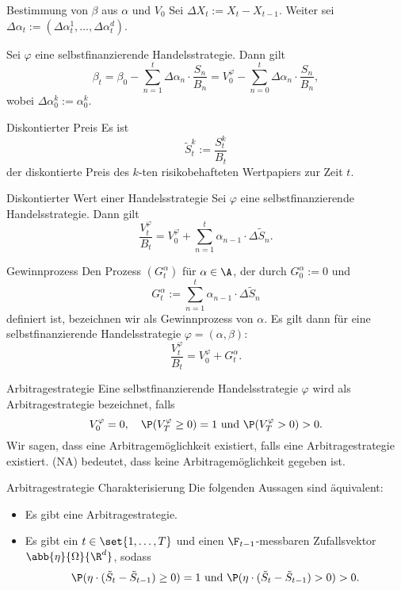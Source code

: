 \begin{karte}{Bestimmung von \(\beta\) aus \(\alpha\) und \(V_0\)}
Sei \(\Delta X_t := X_t - X_{t-1}\). Weiter sei \(\Delta \alpha_t := (\Delta \alpha_t^1, \ldots, \Delta \alpha_t^d)\). 

Sei \(\varphi\) eine selbstfinanzierende Handelsstrategie. Dann gilt 
\[ \beta_t = \beta_0 - \sum_{n=1}^t \Delta \alpha_n \cdot \frac{S_n}{B_n} = V_0^\varphi - \sum_{n=0}^t \Delta \alpha_n \cdot \frac{S_n}{B_n}, \]
wobei \(\Delta \alpha_0^k := \alpha_0^k\).
\end{karte}

\begin{karte}{Diskontierter Preis}
Es ist 
\[ \tilde{S}_t^k := \frac{S_t^k}{B_t} \]
der diskontierte Preis des \(k\)-ten risikobehafteten Wertpapiers zur Zeit \(t\).
\end{karte}

\begin{karte}{Diskontierter Wert einer Handelsstrategie}
Sei \(\varphi\) eine selbstfinanzierende Handelsstrategie. Dann gilt 
\[ \frac{V_t^\varphi}{B_t} = V_0^\varphi + \sum_{n=1}^t \alpha_{n-1} \cdot \Delta \tilde{S}_n. \]
\end{karte}

\begin{karte}{Gewinnprozess}
Den Prozess \((G_t^\alpha)\) für \(\alpha \in \A\), der durch \(G_0^\alpha := 0\) und 
\[ G_t^\alpha := \sum_{n=1}^t \alpha_{n-1} \cdot \Delta \tilde{S}_n \]
definiert ist, bezeichnen wir als Gewinnprozess von \(\alpha\). Es gilt dann für eine selbstfinanzierende 
Handelsstrategie \(\varphi = (\alpha, \beta)\): 
\[ \frac{V_t^\varphi}{B_t} = V_0^\varphi + G_t^\alpha. \]
\end{karte}

\begin{karte}{Arbitragestrategie}
Eine selbstfinanzierende Handelsstrategie \(\varphi\) wird als Arbitragestrategie bezeichnet, falls 
\[ V_0^\varphi = 0,\quad \P(V_T^\varphi \geq 0) = 1 \text{ und } \P(V_T^\varphi > 0) > 0. \]
Wir sagen, dass eine Arbitragemöglichkeit existiert, falls eine Arbitragestrategie existiert. 
(NA) bedeutet, dass keine Arbitragemöglichkeit gegeben ist.
\end{karte}

\begin{karte}{Arbitragestrategie Charakterisierung}
Die folgenden Aussagen sind äquivalent:
\begin{itemize}
    \item Es gibt eine Arbitragestrategie.
    \item Es gibt ein \(t\in \set{1,\ldots, T}\) und einen \(\F_{t-1}\)-messbaren Zufallsvektor \(\abb{\eta}{\Omega}{\R^d}\), sodass 
    \[ \P(\eta \cdot (\tilde{S}_t - \tilde{S}_{t-1}) \geq 0) = 1 \text{ und } \P(\eta \cdot (\tilde{S}_t - \tilde{S}_{t-1}) > 0) > 0. \]
\end{itemize}
\end{karte}

